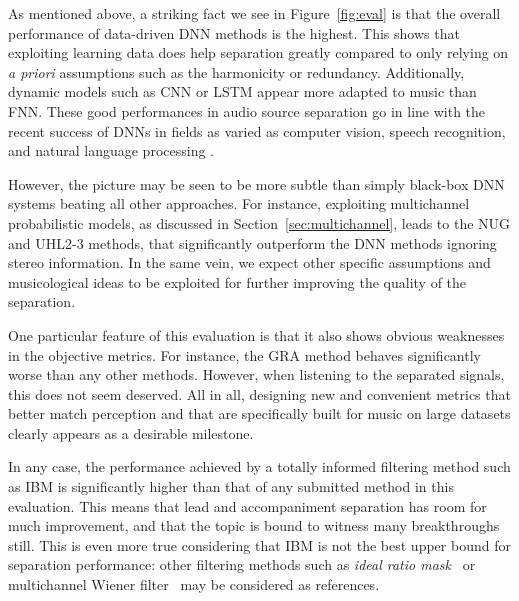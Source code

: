 As mentioned above, a striking fact we see in Figure~\ref{fig:eval} is that the overall performance of data-driven DNN methods is the highest. This shows that exploiting learning data does help separation greatly compared to only relying on \textit{a priori} assumptions such as the harmonicity or redundancy. Additionally, dynamic models such as CNN or LSTM appear more adapted to music than FNN. These good performances in audio source separation go in line with the recent success of DNNs in fields as varied as computer vision, speech recognition, and natural language processing \cite{lecun15}.

However, the picture may be seen to be more subtle than simply black-box DNN systems beating all other approaches. For instance, exploiting multichannel probabilistic models, as discussed in Section~\ref{sec:multichannel}, leads to the NUG and UHL2-3 methods, that significantly outperform the DNN methods ignoring stereo information. In the same vein, we expect other specific assumptions and musicological ideas to be exploited for further improving the quality of the separation.

One particular feature of this evaluation is that it also shows obvious weaknesses in the objective metrics. For instance, the GRA method behaves significantly worse than any other methods. However, when listening to the separated signals, this does not seem deserved. All in all, designing new and convenient metrics that better match perception and that are specifically built for music on large datasets clearly appears as a desirable milestone.

In any case, the performance achieved by a totally informed filtering method such as IBM is significantly higher than that of any submitted method in this evaluation. This means that lead and accompaniment separation has room for much improvement, and that the topic is bound to witness many breakthroughs still. This is even more true considering that IBM is not the best upper bound for separation performance: other filtering methods such as \textit{ideal ratio mask}~\cite{liutkus15c} or multichannel Wiener filter~\cite{duong10} may be considered as references.

